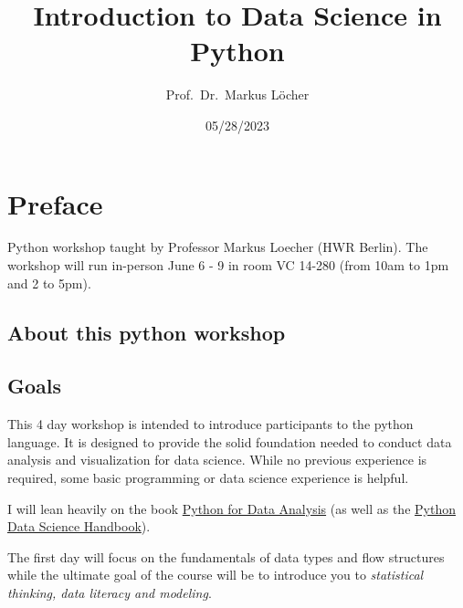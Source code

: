 \documentclass[
  letterpaper,
  DIV=11,
  numbers=noendperiod]{scrreprt}
\title{Introduction to Data Science in Python}
\author{Prof.~Dr.~Markus Löcher}
\date{05/28/2023}
\renewcommand*\contentsname{Table of contents}
\newcommand\contentsname{Table of contents}
\begin{document}
\maketitle
\ifdefined\Shaded\renewenvironment{Shaded}{\begin{tcolorbox}[interior hidden, frame hidden, enhanced, breakable, borderline west={3pt}{0pt}{shadecolor}, boxrule=0pt, sharp corners]}{\end{tcolorbox}}\fi

\renewcommand*\contentsname{Table of contents}
{
\hypersetup{linkcolor=}
\setcounter{tocdepth}{2}
\tableofcontents
}

\hypertarget{preface}{%
\chapter*{Preface}\label{preface}}

Python workshop taught by Professor Markus Loecher (HWR Berlin). The
workshop will run in-person June 6 - 9 in room VC 14-280 (from 10am to
1pm and 2 to 5pm).

\hypertarget{about-this-python-workshop}{%
\section*{About this python workshop}\label{about-this-python-workshop}}

\hypertarget{goals}{%
\section*{Goals}\label{goals}}

This 4 day workshop is intended to introduce participants to the python
language. It is designed to provide the solid foundation needed to
conduct data analysis and visualization for data science. While no
previous experience is required, some basic programming or data science
experience is helpful.

I will lean heavily on the book
\href{https://wesmckinney.com/book/}{Python for Data Analysis} (as well
as the
\href{https://jakevdp.github.io/PythonDataScienceHandbook/}{Python Data
Science Handbook}).

The first day will focus on the fundamentals of data types and flow
structures while the ultimate goal of the course will be to introduce
you to \emph{statistical thinking, data literacy and modeling}.
\end{document}

